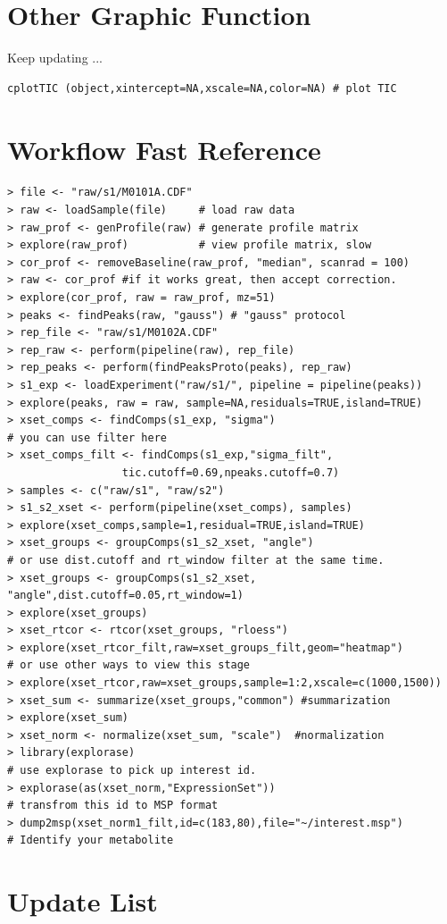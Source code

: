 \documentclass[11pt,a4paper]{article}
\begin{document}
\section{Other Graphic Function}
Keep updating ...
\begin{verbatim}
cplotTIC (object,xintercept=NA,xscale=NA,color=NA) # plot TIC
\end{verbatim}

\newpage
\section{Workflow Fast Reference}
\begin{verbatim}
> file <- "raw/s1/M0101A.CDF"        
> raw <- loadSample(file)     # load raw data
> raw_prof <- genProfile(raw) # generate profile matrix
> explore(raw_prof)           # view profile matrix, slow 
> cor_prof <- removeBaseline(raw_prof, "median", scanrad = 100)
> raw <- cor_prof #if it works great, then accept correction.
> explore(cor_prof, raw = raw_prof, mz=51) 
> peaks <- findPeaks(raw, "gauss") # "gauss" protocol 
> rep_file <- "raw/s1/M0102A.CDF"
> rep_raw <- perform(pipeline(raw), rep_file)
> rep_peaks <- perform(findPeaksProto(peaks), rep_raw)
> s1_exp <- loadExperiment("raw/s1/", pipeline = pipeline(peaks))
> explore(peaks, raw = raw, sample=NA,residuals=TRUE,island=TRUE)
> xset_comps <- findComps(s1_exp, "sigma")
# you can use filter here
> xset_comps_filt <- findComps(s1_exp,"sigma_filt",
                  tic.cutoff=0.69,npeaks.cutoff=0.7)
> samples <- c("raw/s1", "raw/s2")
> s1_s2_xset <- perform(pipeline(xset_comps), samples)
> explore(xset_comps,sample=1,residual=TRUE,island=TRUE)
> xset_groups <- groupComps(s1_s2_xset, "angle")
# or use dist.cutoff and rt_window filter at the same time. 
> xset_groups <- groupComps(s1_s2_xset, "angle",dist.cutoff=0.05,rt_window=1)
> explore(xset_groups)
> xset_rtcor <- rtcor(xset_groups, "rloess")
> explore(xset_rtcor_filt,raw=xset_groups_filt,geom="heatmap")
# or use other ways to view this stage
> explore(xset_rtcor,raw=xset_groups,sample=1:2,xscale=c(1000,1500))
> xset_sum <- summarize(xset_groups,"common") #summarization
> explore(xset_sum)
> xset_norm <- normalize(xset_sum, "scale")  #normalization
> library(explorase)
# use explorase to pick up interest id.
> explorase(as(xset_norm,"ExpressionSet"))
# transfrom this id to MSP format 
> dump2msp(xset_norm1_filt,id=c(183,80),file="~/interest.msp") 
# Identify your metabolite
\end{verbatim}
\newpage
\section{Update List}
\end{document}
